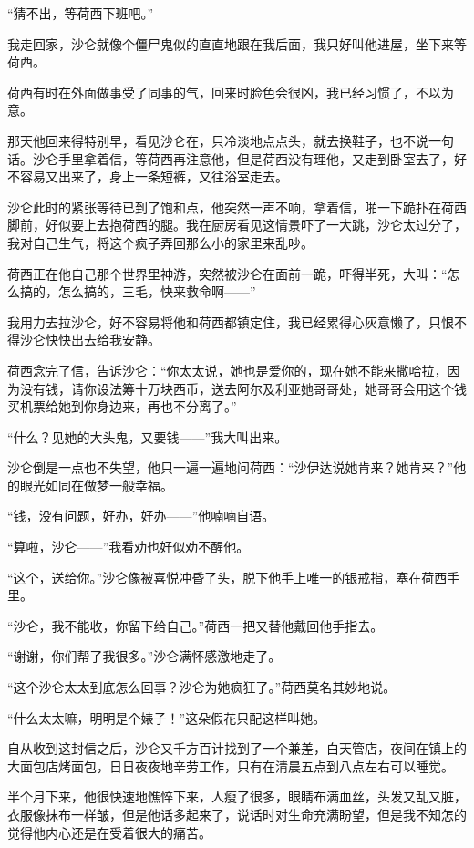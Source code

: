 \par “猜不出，等荷西下班吧。”
\par 我走回家，沙仑就像个僵尸鬼似的直直地跟在我后面，我只好叫他进屋，坐下来等荷西。
\par 荷西有时在外面做事受了同事的气，回来时脸色会很凶，我已经习惯了，不以为意。
\par 那天他回来得特别早，看见沙仑在，只冷淡地点点头，就去换鞋子，也不说一句话。沙仑手里拿着信，等荷西再注意他，但是荷西没有理他，又走到卧室去了，好不容易又出来了，身上一条短裤，又往浴室走去。
\par 沙仑此时的紧张等待已到了饱和点，他突然一声不响，拿着信，啪一下跪扑在荷西脚前，好似要上去抱荷西的腿。我在厨房看见这情景吓了一大跳，沙仑太过分了，我对自己生气，将这个疯子弄回那么小的家里来乱吵。
\par 荷西正在他自己那个世界里神游，突然被沙仑在面前一跪，吓得半死，大叫：“怎么搞的，怎么搞的，三毛，快来救命啊——”
\par 我用力去拉沙仑，好不容易将他和荷西都镇定住，我已经累得心灰意懒了，只恨不得沙仑快快出去给我安静。
\par 荷西念完了信，告诉沙仑：“你太太说，她也是爱你的，现在她不能来撒哈拉，因为没有钱，请你设法筹十万块西币，送去阿尔及利亚她哥哥处，她哥哥会用这个钱买机票给她到你身边来，再也不分离了。”
\par “什么？见她的大头鬼，又要钱——”我大叫出来。
\par 沙仑倒是一点也不失望，他只一遍一遍地问荷西：“沙伊达说她肯来？她肯来？”他的眼光如同在做梦一般幸福。
\par “钱，没有问题，好办，好办——”他喃喃自语。
\par “算啦，沙仑——”我看劝也好似劝不醒他。
\par “这个，送给你。”沙仑像被喜悦冲昏了头，脱下他手上唯一的银戒指，塞在荷西手里。
\par “沙仑，我不能收，你留下给自己。”荷西一把又替他戴回他手指去。
\par “谢谢，你们帮了我很多。”沙仑满怀感激地走了。
\par “这个沙仑太太到底怎么回事？沙仑为她疯狂了。”荷西莫名其妙地说。
\par “什么太太嘛，明明是个婊子！”这朵假花只配这样叫她。
\par 自从收到这封信之后，沙仑又千方百计找到了一个兼差，白天管店，夜间在镇上的大面包店烤面包，日日夜夜地辛劳工作，只有在清晨五点到八点左右可以睡觉。
\par 半个月下来，他很快速地憔悴下来，人瘦了很多，眼睛布满血丝，头发又乱又脏，衣服像抹布一样皱，但是他话多起来了，说话时对生命充满盼望，但是我不知怎的觉得他内心还是在受着很大的痛苦。
